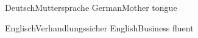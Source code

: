 \documentclass[11pt, a4paper]{andre-bewerbung}
\begin{document}

\begin{cventries}
    \msinglecventry%
    {Deutsch}{Muttersprache}{}%
    {German}{Mother tongue}{}

    \msinglecventry%
    {Englisch}{Verhandlungssicher}{}%
    {English}{Business fluent}{}
\end{cventries}

\end{document}

